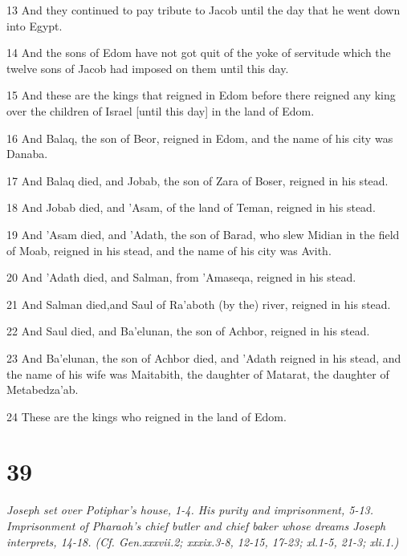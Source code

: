 \par 13 And they continued to pay tribute to Jacob until the day that he went down into Egypt.
\par 14 And the sons of Edom have not got quit of the yoke of servitude which the twelve sons of Jacob had imposed on them until this day.
\par 15 And these are the kings that reigned in Edom before there reigned any king over the children of Israel [until this day] in the land of Edom.
\par 16 And Balaq, the son of Beor, reigned in Edom, and the name of his city was Danaba.
\par 17 And Balaq died, and Jobab, the son of Zara of Boser, reigned in his stead.
\par 18 And Jobab died, and 'Asam, of the land of Teman, reigned in his stead.
\par 19 And 'Asam died, and 'Adath, the son of Barad, who slew Midian in the field of Moab, reigned in his stead, and the name of his city was Avith.
\par 20 And 'Adath died, and Salman, from 'Amaseqa, reigned in his stead.
\par 21 And Salman died,and Saul of Ra'aboth (by the) river, reigned in his stead.
\par 22 And Saul died, and Ba'elunan, the son of Achbor, reigned in his stead.
\par 23 And Ba'elunan, the son of Achbor died, and 'Adath reigned in his stead, and the name of his wife was Maitabith, the daughter of Matarat, the daughter of Metabedza'ab.
\par 24 These are the kings who reigned in the land of Edom.

\chapter{39}

\par \textit{Joseph set over Potiphar's house, 1-4. His purity and imprisonment, 5-13. Imprisonment of Pharaoh's chief butler and chief baker whose dreams Joseph interprets, 14-18. (Cf. Gen.xxxvii.2; xxxix.3-8, 12-15, 17-23; xl.1-5, 21-3; xli.1.)}

